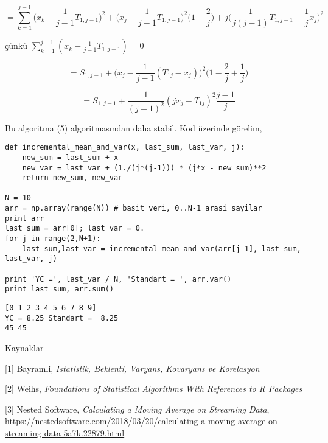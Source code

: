\documentclass[12pt,fleqn]{article}\usepackage{../../common}
\begin{document}
$$ 
= \sum _{k=1}^{j-1} \bigg( x_k - \frac{1}{j-1} T_{1,j-1} \bigg)^2 + 
\bigg( x_j - \frac{1}{j-1} T_{1,j-1} \bigg)^2 \bigg( 1-\frac{2}{j} \bigg) + 
j \bigg( \frac{1}{j(j-1)} T_{1,j-1} - \frac{1}{j}x_j \bigg)^2
$$

çünkü $\sum _{k=1}^{j-1} (x_k-\frac{1}{j-1} T_{1,j-1} )=0$

$$ 
= S_{1,j-1}  + \bigg( x_j - \frac{1}{j-1} (T_{1j}-x_j) \bigg) ^2
\bigg( 1-\frac{2}{j}+\frac{1}{j}\bigg)
$$

$$ = S_{1,j-1} + \frac{1}{(j-1)^2} (jx_j - T_{1j})^2 \frac{j-1}{j} $$

Bu algoritma (5) algoritmasından daha stabil. Kod üzerinde görelim,

\begin{verbatim}
def incremental_mean_and_var(x, last_sum, last_var, j):
    new_sum = last_sum + x
    new_var = last_var + (1./(j*(j-1))) * (j*x - new_sum)**2 
    return new_sum, new_var

N = 10
arr = np.array(range(N)) # basit veri, 0..N-1 arasi sayilar
print arr
last_sum = arr[0]; last_var = 0.
for j in range(2,N+1):
    last_sum,last_var = incremental_mean_and_var(arr[j-1], last_sum, last_var, j)

print 'YC =', last_var / N, 'Standart = ', arr.var()
print last_sum, arr.sum()
\end{verbatim}

\begin{verbatim}
[0 1 2 3 4 5 6 7 8 9]
YC = 8.25 Standart =  8.25
45 45
\end{verbatim}


Kaynaklar

[1] Bayramli, {\em Istatistik, Beklenti, Varyans, Kovaryans ve Korelasyon}

[2] Weihs, {\em Foundations of Statistical Algorithms With References to R Packages}

[3] Nested Software, {\em Calculating a Moving Average on Streaming Data},
    \url{https://nestedsoftware.com/2018/03/20/calculating-a-moving-average-on-streaming-data-5a7k.22879.html}
\end{document}
